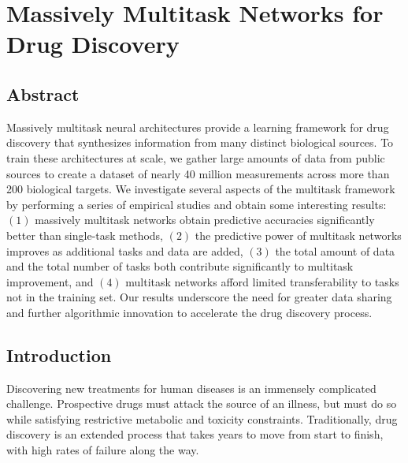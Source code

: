 

%

\section{Massively Multitask Networks for Drug Discovery}


\subsection{Abstract}
Massively multitask neural architectures provide a learning framework for
drug discovery that synthesizes information from many distinct biological
sources. To train these architectures at scale, we gather large amounts of
data from public sources to create a dataset of nearly 40 million
measurements across more than 200 biological targets. We investigate
several aspects of the multitask framework by performing a series of
empirical studies and obtain some interesting results: $(1)$ massively
multitask networks obtain predictive accuracies significantly better than
single-task methods, $(2)$ the predictive power of multitask networks
improves as additional tasks and data are added, $(3)$ the total amount of
data and the total number of tasks both contribute significantly to
multitask improvement, and $(4)$ multitask networks afford limited
transferability to tasks not in the training set. Our results underscore
the need for greater data sharing and further algorithmic innovation to
accelerate the drug discovery process.


\subsection{Introduction}
\label{intro}

Discovering new treatments for human diseases is an immensely complicated
challenge. Prospective drugs must attack the source of an illness, but must
do so while satisfying restrictive metabolic and toxicity constraints.
Traditionally, drug discovery is an extended process that takes years to
move from start to finish, with high rates of failure along the way.

